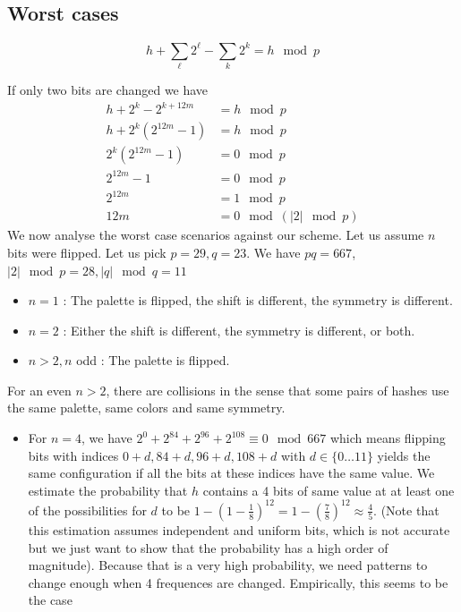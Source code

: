 \documentclass{article}
\begin{document}
\subsection{Worst cases}
$$	h + \sum\limits_\ell 2^\ell - \sum\limits_k 2^k = h \mod p $$

If only two bits are changed we have
\begin{align*}
	h + 2^k - 2^{k+12m} &= h \mod p\\
	h + 2^k(2^{12m} - 1) &= h \mod p \\
	2^k (2^{12m} - 1) &= 0 \mod p \\
	2^{12m} - 1 &= 0 \mod p \\
	2^{12m} &= 1 \mod p \\
	12m &= 0 \mod (|2| \mod p)
\end{align*}
We now analyse the worst case scenarios against our scheme. Let us assume $n$ bits were flipped. Let us pick $p=29, q=23$. We have $pq = 667$, $|2| \mod p = 28, |q| \mod q = 11$
\begin{itemize}
	\item $n=1$ : The palette is flipped, the shift is different, the symmetry is different.
	\item $n=2$ : Either the shift is different, the symmetry is different, or both.
	\item $n > 2, n$ odd : The palette is flipped.
\end{itemize}
For an even $n > 2$, there are collisions in the sense that some pairs of hashes use the same palette, same colors and same symmetry.
\begin{itemize}
	\item For $n = 4$, we have $2^0 + 2^{84} + 2^{96} + 2^{108} \equiv 0 \mod 667$ which means flipping bits with indices $0 + d, 84 + d, 96 + d, 108 + d$ with $d \in \{0 \dots 11\}$ yields the same configuration if all the bits at these indices have the same value. We estimate the probability that $h$ contains a 4 bits of same value at at least one of the possibilities for $d$ to be $1 - \left(1 - \frac{1}{8}\right)^{12} = 1 - \left(\frac{7}{8}\right)^{12} \approx \frac{4}{5}$. (Note that this estimation assumes independent and uniform bits, which is not accurate but we just want to show that the probability has a high order of magnitude). Because that is a very high probability, we need patterns to change enough when 4 frequences are changed. Empirically, this seems to be the case
\end{itemize}
\end{document}
